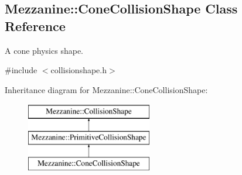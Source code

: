 \hypertarget{classMezzanine_1_1ConeCollisionShape}{
\subsection{Mezzanine::ConeCollisionShape Class Reference}
\label{classMezzanine_1_1ConeCollisionShape}
}


A cone physics shape.  




{\ttfamily \#include $<$collisionshape.h$>$}

Inheritance diagram for Mezzanine::ConeCollisionShape:\begin{figure}[H]
\begin{center}
\leavevmode
\includegraphics[height=3.000000cm]{classMezzanine_1_1ConeCollisionShape}
\end{center}
\end{figure}
